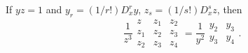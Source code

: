 If $yz = 1$ and $y_{r} = (1/r!) D_{x}^{r}y$, $z_{s} = (1/s!) D_{x}^{s}z$, then
\[
\frac{1}{z^{3}}
\begin{matrix}
    z    & z_{1}& z_{2}\\
    z_{1}& z_{2}& z_{3}\\
    z_{2}& z_{3}& z_{4}
\end{matrix}
= \frac{1}{y^{2}}
\begin{matrix}
    y_{2}& y_{3}\\
    y_{3}& y_{4}
\end{matrix}.
\]

